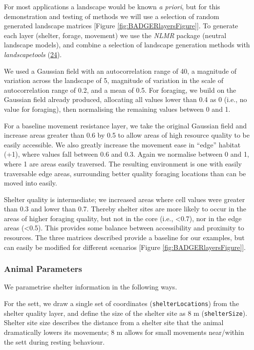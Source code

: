 \documentclass[10pt,a4paper]{article}
\begin{document}
For most applications a landscape would be known \emph{a priori}, but for this demonstration and testing of methods we will use a selection of random generated landscape matrices {[}Figure \ref{fig:BADGERlayersFigure}{]}.
To generate each layer (shelter, forage, movement) we use the \emph{NLMR} package (neutral landscape models), and combine a selection of landscape generation methods with \emph{landscapetools} (\protect\hyperlink{ref-Sciaini2018}{24}).

We used a Gaussian field with an autocorrelation range of 40, a magnitude of variation across the landscape of 5, magnitude of variation in the scale of autocorrelation range of 0.2, and a mean of 0.5.
For foraging, we build on the Gaussian field already produced, allocating all values lower than 0.4 as 0 (i.e., no value for foraging), then normalising the remaining values between 0 and 1.

For a baseline movement resistance layer, we take the original Gaussian field and increase areas greater than 0.6 by 0.5 to allow areas of high resource quality to be easily accessible.
We also greatly increase the movement ease in ``edge'' habitat (+1), where values fall between 0.6 and 0.3.
Again we normalise between 0 and 1, where 1 are areas easily traversed.
The resulting environment is one with easily traversable edge areas, surrounding better quality foraging locations than can be moved into easily.

Shelter quality is intermediate; we increased areas where cell values were greater than 0.3 and lower than 0.7.
Thereby shelter sites are more likely to occur in the areas of higher foraging quality, but not in the core (i.e., \textless0.7), nor in the edge areas (\textless0.5).
This provides some balance between accessibility and proximity to resources.
The three matrices described provide a baseline for our examples, but can easily be modified for different scenarios {[}Figure \ref{fig:BADGERlayersFigure}{]}.

\hypertarget{animal-parameters}{%
\subsubsection{Animal Parameters}\label{animal-parameters}}

We parametrise shelter information in the following ways.

For the sett, we draw a single set of coordinates (\texttt{shelterLocations}) from the shelter quality layer, and define the size of the shelter site as 8 m (\texttt{shelterSize}).
Shelter site size describes the distance from a shelter site that the animal dramatically lowers its movements; 8 m allows for small movements near/within the sett during resting behaviour.
\end{document}
